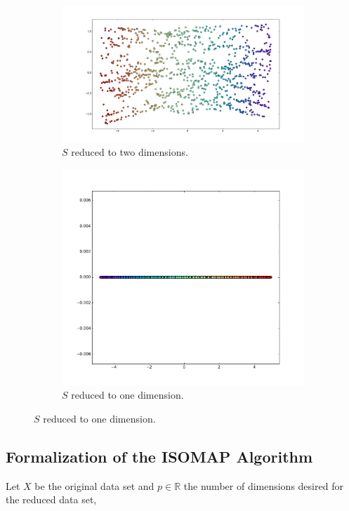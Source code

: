 \documentclass[12pt]{report}
\begin{document}
\begin{figure}[H]
    \begin{subfigure}{.5\linewidth}
		\centering
		\captionsetup{justification=centering}
		\includegraphics[width=\linewidth]{studying_isomap/embedding_2}
		\caption{$S$ reduced to two dimensions.}
		\label{fig:mani_s_reduced_1}
	\end{subfigure}%
	\begin{subfigure}{.5\linewidth}
		\centering
		\captionsetup{justification=centering}
		\includegraphics[width=.63\linewidth]{studying_isomap/embedding_1}
		\caption{$S$ reduced to one dimension.}
		\label{fig:mani_s_reduced_2}
	\end{subfigure}
\end{figure}

\newpage
\subsection{Formalization of the ISOMAP Algorithm}

Let $X$ be the original data set and $p \in \mathbb{R}$ the number of dimensions desired for the reduced data set, \cite{ten2000}
\end{document}
